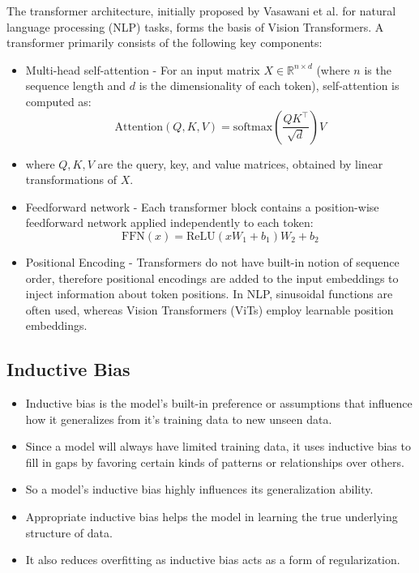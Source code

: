 \documentclass[conference]{IEEEtran}
\begin{document}
The transformer architecture, initially proposed by Vasawani et al. for natural language processing (NLP) tasks, forms the basis of Vision Transformers. A transformer primarily consists of the following key components:
\begin{itemize}
\item Multi-head self-attention - For an input matrix \( X \in \mathbb{R}^{n \times d} \) (where \( n \) is the sequence length and \( d \) is the dimensionality of each token), self-attention is computed as:
\begin{equation}
\text{Attention}(Q, K, V) = \text{softmax}\left( \frac{QK^\top}{\sqrt{d}} \right)V    
\end{equation}
\item 
where \( Q, K, V \) are the query, key, and value matrices, obtained by linear transformations of \( X \).

\item Feedforward network - Each transformer block contains a position-wise feedforward network applied independently to each token: 
\begin{equation}
    \text{FFN}(x) = \text{ReLU}(x W_1 + b_1) W_2 + b_2
\end{equation}
\item Positional Encoding - Transformers do not have built-in notion of sequence order, therefore positional encodings are added to the input embeddings to inject information about token positions. In NLP, sinusoidal functions are often used, whereas Vision Transformers (ViTs) employ learnable position embeddings. 
\end{itemize}

\subsection{Inductive Bias}
\begin{itemize}
    \item Inductive bias is the model's built-in preference or assumptions that influence how it generalizes from it's training data to new unseen data.
    \item Since a model will always have limited training data, it uses inductive bias to fill in gaps by favoring certain kinds of patterns or relationships over others.
    \item So a model's inductive bias highly influences its generalization ability.
    \item Appropriate inductive bias helps the model in learning the true underlying structure of data.
    \item It also reduces overfitting as inductive bias acts as a form of regularization.
\end{itemize}
\end{document}
